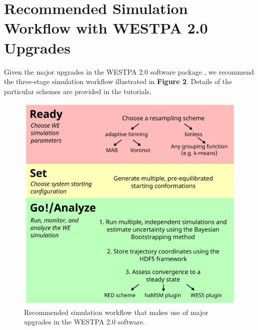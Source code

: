 \section{Recommended Simulation Workflow with WESTPA 2.0 Upgrades}

Given the major upgrades in the WESTPA 2.0 software package \citep{russo_westpa_2022}, we recommend the three-stage simulation workflow illustrated in \textbf{Figure 2}. Details of the particular schemes are provided in the tutorials.

\begin{figure}[ht]
\centering
\includegraphics[width=\columnwidth]{figures/Figure2_workflow.pdf}
\caption{Recommended simulation workflow that makes use of major upgrades in the WESTPA 2.0 software.}
\end{figure}

